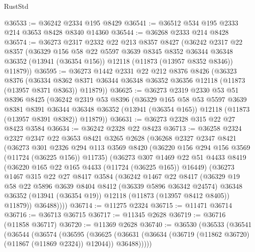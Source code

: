 \begin{lexlean}{RustStd}
\begin{coremodule}
@36533 := @36242 @2334 @195 @8429
@36541 := @36512 @534 @195 @2333 @214 @3653 @8428 @8340 @14360
@36544 := @36268 @2333 @214 @8428
@36574 := @36273
    @2317
    @2332
    @22
    @213
    @8357
    @8427
    (@36242
      @2317
      @22
      @8357
      (@36329
        @156
        @58
        @22
        @5597
        @3639
        @8345
        @8352
        @36344
        @36348
        @36352
        (@13941 (@36354 @156))
        @12118
        (@11873 (@13957 @8352 @8346))
        @11879))
@36595 := @36273
    @1442
    @2331
    @22
    @212
    @8376
    @8426
    (@36323
      @8376
      (@36334 @8362 @8371 @36344 @36348 @36352 @36356 @12118 (@11873 (@13957 @8371 @8363)) @11879))
@36625 := @36273
    @2319
    @2330
    @53
    @51
    @8396
    @8425
    (@36242
      @2319
      @53
      @8396
      (@36329
        @165
        @58
        @53
        @5597
        @3639
        @8381
        @8391
        @36344
        @36348
        @36352
        (@13941 (@36354 @165))
        @12118
        (@11873 (@13957 @8391 @8382))
        @11879))
@36631 := @36273 @2328 @315 @22 @27 @8423 @3584
@36634 := @36242 @2328 @22 @8423
@36713 := @36258
    @2324
    @2327
    @2347
    @22
    @3653
    @8421
    @3265
    @2628
    (@36268
      @2327
      @2347
      @8421
      (@36273
        @301
        @2326
        @294
        @113
        @3569
        @8420
        (@36220 @156 @294 @156 @3569 (@11724 (@36225 @156)) @11735)
        (@36273
          @307
          @1469
          @22
          @51
          @4433
          @8419
          (@36220 @165 @22 @165 @4433 (@11724 (@36225 @165)) @16449)
          (@36273
            @1467
            @315
            @22
            @27
            @8417
            @3584
            (@36242
              @1467
              @22
              @8417
              (@36329
                @19
                @58
                @22
                @5896
                @3639
                @8404
                @8412
                (@36339 @5896 @36342 @24574)
                @36348
                @36352
                (@13941 (@36354 @19))
                @12118
                (@11873 (@13957 @8412 @8405))
                @11879))
            @36488))))
@36714 := @11275 @2324
@36715 := @11471 @36714
@36716 := @36713 @36715
@36717 := @11345 @2628
@36719 := @36716 (@11858 @36717)
@36720 := @11369 @2628
@36740 := @36530
    (@36533
      (@36541
        (@36544
          (@36574
            (@36595
              (@36625
                (@36631 (@36634 (@36719 (@11862 @36720) (@11867 (@11869 @2324)) @12044)) @36488)))))

\end{coremodule}
\end{lexlean}
